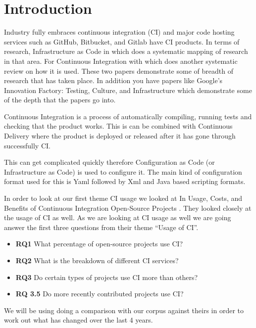 \documentclass[10pt,conference]{IEEEtran}
\begin{document}
\section{Introduction}
\label{Introduction}

Industry fully embraces continuous integration (CI)
and major code hosting services such as GitHub, Bitbucket, and Gitlab
have CI products.
In terms of research, Infrastructure as Code in \citet{Rahman2019} which does a systematic mapping of research in that area. For Continuous Integration with \citet{Shahin2017} which does another systematic review on how it is used. These two papers demonstrate some of breadth of research that has taken place. In addition you have papers like Google's Innovation Factory: Testing, Culture, and Infrastructure \citet{Copeland2010} which demonstrate some of the depth that the papers go into.

Continuous Integration is a process of automatically compiling, running tests and checking that the product works. This is can be combined with Continuous Delivery where the product is deployed or released after it has gone through successfully CI. 

This can get complicated quickly therefore Configuration as Code (or Infrastructure as Code) is used to configure it. The main kind of configuration format used for this is Yaml followed by Xml and Java based scripting formats.


In order to look at our first theme CI usage we looked at In Usage, Costs, and Benefits of Continuous Integration Open-Source Projects \cite{Hilton2016}. They looked closely at the usage of CI as well. As we are looking at CI usage as well we are going answer the first three questions from their theme \enquote{Usage of CI}. 
\begin{itemize}
  \item \textbf{RQ1} What percentage of open-source projects use CI?
  \item \textbf{RQ2} What is the breakdown of different CI services?
  \item \textbf{RQ3} Do certain types of projects use CI more than others?
  \item \textbf{RQ 3.5} Do more recently contributed projects use CI?
\end{itemize}

We will be using doing a comparison with our corpus against theirs in order to work out what has changed over the last 4 years. 
\end{document}
